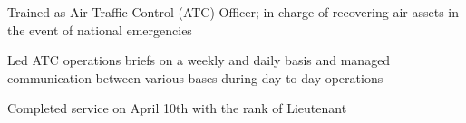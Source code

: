 \begin{cvitemize}
\item Trained as Air Traffic Control (ATC) Officer; in charge of recovering air assets in the event of national emergencies
\item Led ATC operations briefs on a weekly and daily basis and managed communication between various bases during day-to-day operations
\item Completed service on April 10th with the rank of Lieutenant
\end{cvitemize}